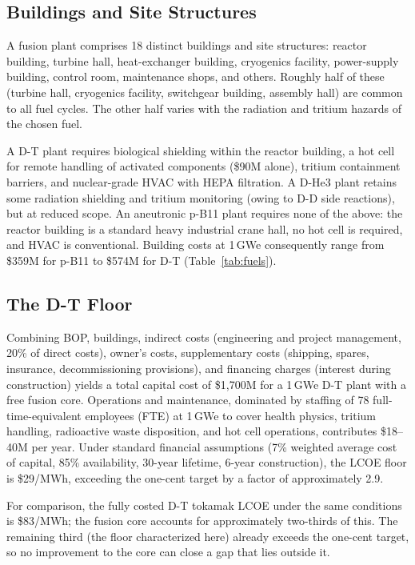 \documentclass{article}
\begin{document}
\subsection{Buildings and Site Structures}
\label{sec:buildings}

A fusion plant comprises 18 distinct buildings and
site structures: reactor building, turbine hall, heat-exchanger
building, cryogenics facility, power-supply building, control room,
maintenance shops, and others. Roughly half of these (turbine hall,
cryogenics facility, switchgear building, assembly hall) are common to all
fuel cycles. The other half varies with the radiation and tritium
hazards of the chosen fuel.

A D-T plant requires biological shielding within the reactor
building, a hot cell for remote handling of activated components
(\$90M alone), tritium containment barriers, and nuclear-grade HVAC
with HEPA filtration. A D-He3 plant retains some radiation shielding
and tritium monitoring (owing to D-D side reactions), but at reduced
scope. An aneutronic p-B11 plant requires none of the above: the
reactor building is a standard heavy industrial crane hall, no hot
cell is required, and HVAC is conventional. Building costs at
1\,GWe consequently range from \$359M for p-B11 to \$574M for D-T
(Table~\ref{tab:fuels}).

\subsection{The D-T Floor}
\label{sec:dt}

Combining BOP, buildings, indirect costs (engineering and project
management, 20\% of direct costs), owner's costs,
supplementary costs (shipping, spares, insurance, decommissioning
provisions), and financing charges (interest during construction)
yields a total capital cost of \$1{,}700M for a 1\,GWe D-T plant
with a free fusion core. Operations and maintenance, dominated by
staffing of 78 full-time-equivalent employees (FTE) at
1\,GWe to cover health physics, tritium handling, radioactive waste
disposition, and hot cell operations, contributes \$18--40M per
year. Under standard financial assumptions (7\% weighted average
cost of capital, 85\% availability, 30-year lifetime, 6-year
construction), the LCOE floor is \$29/MWh, exceeding the one-cent
target by a factor of approximately 2.9.

For comparison, the fully costed D-T tokamak LCOE under the same
conditions is \$83/MWh; the fusion core accounts for approximately
two-thirds of this. The remaining third (the floor characterized
here) already exceeds the one-cent target, so no improvement to the
core can close a gap that lies outside it.
\end{document}

